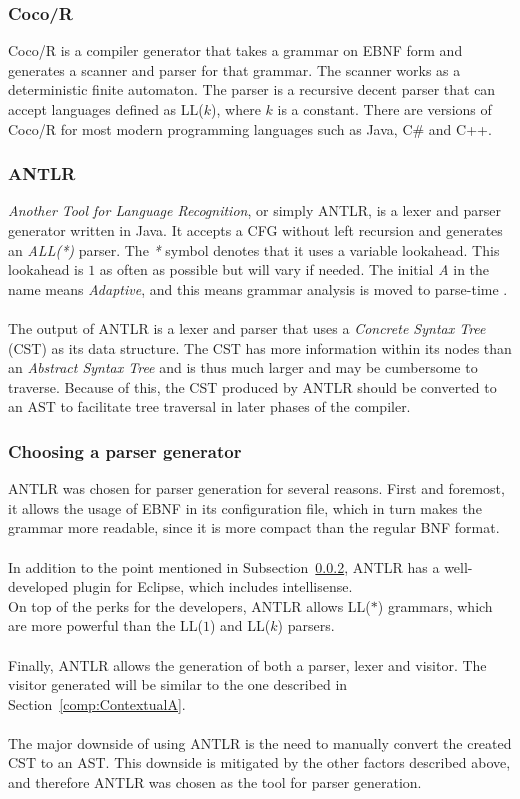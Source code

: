 \subsubsection{Coco/R}
Coco/R is a compiler generator that takes a grammar on EBNF form and generates a scanner and parser for that grammar. The scanner works as a deterministic finite automaton. The parser is a recursive decent parser that can accept languages defined as LL($k$), where $k$ is a constant. There are versions of Coco/R for most modern programming languages such as Java, C\# and C++. 

\subsubsection{ANTLR}\label{ss:antlr}
\textit{Another Tool for Language Recognition}, or simply ANTLR, is a lexer and parser generator written in Java. It accepts a CFG without left recursion and generates an \textit{ALL(*)} parser. The \textit{*} symbol denotes that it uses a variable lookahead. This lookahead is $1$ as often as possible but will vary if needed. The initial \textit{A} in the name means \textit{Adaptive}, and this means grammar analysis is moved to parse-time \cite{AdaptiveLL(*)}.
\\\\
The output of ANTLR is a lexer and parser that uses a \textit{Concrete Syntax Tree} (CST) as its data structure. The CST has more information within its nodes than an \textit{Abstract Syntax Tree} and is thus much larger and may be cumbersome to traverse. Because of this, the CST produced by ANTLR should be converted to an AST to facilitate tree traversal in later phases of the compiler. 

\subsubsection{Choosing a parser generator}
ANTLR was chosen for parser generation for several reasons. 
First and foremost, it allows the usage of EBNF in its configuration file, which in turn makes the grammar more readable, since it is more compact than the regular BNF format. 
\\\\
In addition to the point mentioned in Subsection~\ref{ss:antlr}, ANTLR has a well-developed plugin for Eclipse, which includes intellisense.\\
On top of the perks for the developers, ANTLR allows LL($*$) grammars, which are more powerful than the LL($1$) and LL($k$) parsers.
\\\\
Finally, ANTLR allows the generation of both a parser, lexer and visitor. The visitor generated will be similar to the one described in Section~\ref{comp:ContextualA}.
\\\\
The major downside of using ANTLR is the need to manually convert the created CST to an AST. This downside is mitigated by the other factors described above, and therefore ANTLR was chosen as the tool for parser generation.
